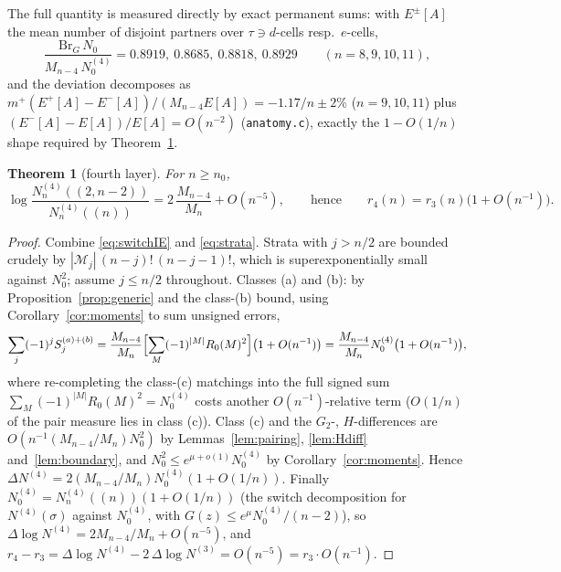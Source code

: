 \documentclass[11pt]{article}
\newtheorem{theorem}{Theorem}[section]
\theoremstyle{definition}
\begin{document}
\medskip
\noindent
The full quantity is measured directly by exact permanent sums: with
$E^\pm[A]$ the mean number of disjoint partners over $\tau\ni d$-cells
resp.\ $e$-cells,
\[
\frac{\mathrm{Br}_G\,N_0}{M_{n-4}\,N^{(4)}_0}
=0.8919,\ 0.8685,\ 0.8818,\ 0.8929
\qquad(n=8,9,10,11),
\]
and the deviation decomposes as
$m^+(E^+[A]-E^-[A])/(M_{n-4}E[A])=-1.17/n\pm2\%$ ($n=9,10,11$) plus
$(E^-[A]-E[A])/E[A]=O(n^{-2})$ (\texttt{anatomy.c}), exactly the
$1-O(1/n)$ shape required by Theorem~\ref{thm:layer4}.

\begin{theorem}[fourth layer]\label{thm:layer4}
For $n\ge n_0$,
\[
\log\frac{N^{(4)}_n((2,n{-}2))}{N^{(4)}_n((n))}
=2\,\frac{M_{n-4}}{M_n}+O(n^{-5}),
\qquad\text{hence}\qquad
r_4(n)=r_3(n)\bigl(1+O(n^{-1})\bigr).
\]
\end{theorem}

\begin{proof}
Combine \eqref{eq:switchIE} and \eqref{eq:strata}.  Strata with
$j>n/2$ are bounded crudely by
$|\mathcal M_j|\,(n-j)!\,(n-j-1)!$, which is superexponentially small
against $N_0^2$; assume $j\le n/2$ throughout.  Classes (a) and (b):
by Proposition~\ref{prop:generic} and the class-(b) bound, using
Corollary~\ref{cor:moments} to sum unsigned errors,
\[
\sum_j(-1)^jS_j^{(a)+(b)}
=\frac{M_{n-4}}{M_n}\Bigl[\sum_M(-1)^{|M|}R_0(M)^2\Bigr]\bigl(1+O(n^{-1})\bigr)
=\frac{M_{n-4}}{M_n}N^{(4)}_0\bigl(1+O(n^{-1})\bigr),
\]
where re-completing the class-(c) matchings into the full signed sum
$\sum_M(-1)^{|M|}R_0(M)^2=N^{(4)}_0$ costs another
$O(n^{-1})$-relative term ($O(1/n)$ of the pair measure lies in class
(c)).  Class (c) and the $G_2$-, $H$-differences are
$O(n^{-1}(M_{n-4}/M_n)N_0^2)$ by Lemmas~\ref{lem:pairing},
\ref{lem:Hdiff} and~\ref{lem:boundary}, and $N_0^2\le e^{\mu+o(1)}
N^{(4)}_0$ by Corollary~\ref{cor:moments}.  Hence
$\Delta N^{(4)}=2(M_{n-4}/M_n)N^{(4)}_0(1+O(1/n))$.  Finally
$N^{(4)}_0=N^{(4)}_n((n))(1+O(1/n))$ (the switch decomposition for
$N^{(4)}(\sigma)$ against $N^{(4)}_0$, with $G(z)\le e^{\mu}N^{(4)}_0/
(n-2)$), so $\Delta\log N^{(4)}=2M_{n-4}/M_n+O(n^{-5})$, and
$r_4-r_3=\Delta\log N^{(4)}-2\,\Delta\log N^{(3)}
=O(n^{-5})=r_3\cdot O(n^{-1})$.
\end{proof}
\end{document}
